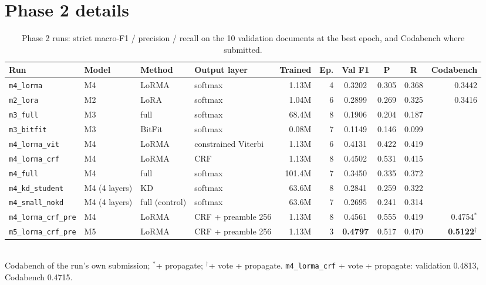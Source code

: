 \documentclass[11pt, oneside]{article}
\newcommand{\run}[1]{\texttt{#1}}
\newcommand{\best}[1]{\textbf{#1}}
\begin{document}
\section{Phase 2 details}\label{app:p2}
\begin{table}[H]
\centering\small
\caption{Phase 2 runs: strict macro-F1 / precision / recall on the 10 validation documents at the best epoch, and Codabench where submitted.}
\label{tab:p2runs}
\begin{adjustbox}{max width=\textwidth}
\begin{tabular}{llllrrccc r}
\toprule
Run & Model & Method & Output layer & Trained & Ep. & Val F1 & P & R & Codabench\\
\midrule
\run{m4\_lorma}          & M4 & LoRMA  & softmax & 1.13M  & 4 & 0.3202 & 0.305 & 0.368 & 0.3442\\
\run{m2\_lora}           & M2 & LoRA   & softmax & 1.04M  & 6 & 0.2899 & 0.269 & 0.325 & 0.3416\\
\run{m3\_full}           & M3 & full   & softmax & 68.4M  & 8 & 0.1906 & 0.204 & 0.187 & \\
\run{m3\_bitfit}         & M3 & BitFit & softmax & 0.08M  & 7 & 0.1149 & 0.146 & 0.099 & \\
\run{m4\_lorma\_vit}     & M4 & LoRMA  & constrained Viterbi & 1.13M & 6 & 0.4131 & 0.422 & 0.419 & \\
\run{m4\_lorma\_crf}     & M4 & LoRMA  & CRF     & 1.13M  & 8 & 0.4502 & 0.531 & 0.415 & \\
\run{m4\_full}           & M4 & full   & softmax & 101.4M & 7 & 0.3450 & 0.335 & 0.372 & \\
\run{m4\_kd\_student}    & M4 (4 layers) & KD & softmax & 63.6M & 8 & 0.2841 & 0.259 & 0.322 & \\
\run{m4\_small\_nokd}    & M4 (4 layers) & full (control) & softmax & 63.6M & 7 & 0.2695 & 0.241 & 0.314 & \\
\run{m4\_lorma\_crf\_pre} & M4 & LoRMA & CRF + preamble 256 & 1.13M & 8 & 0.4561 & 0.555 & 0.419 & 0.4754$^*$\\
\run{m5\_lorma\_crf\_pre} & M5 & LoRMA & CRF + preamble 256 & 1.13M & 3 & \best{0.4797} & 0.517 & 0.470 & \best{0.5122}$^\dagger$\\
\bottomrule
\end{tabular}
\end{adjustbox}
\\[1pt]{\footnotesize Codabench of the run's own submission; $^*$+ propagate; $^\dagger$+ vote + propagate.
\run{m4\_lorma\_crf} + vote + propagate: validation 0.4813, Codabench 0.4715.}
\end{table}
\end{document}
